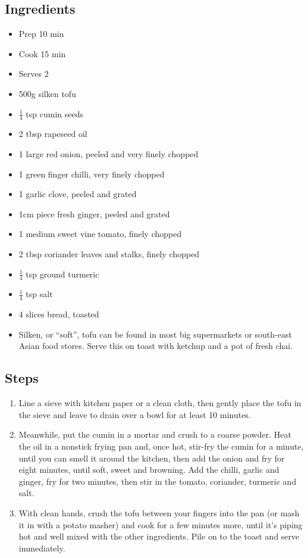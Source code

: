 \documentclass{book}
\begin{document}
\subsection*{Ingredients}
\begin{itemize}
\item Prep 10 min
\item Cook 15 min
\item Serves 2
\end{itemize}

\begin{itemize}
\item 500g silken tofu
\item $\frac{1}{4}$ tsp cumin seeds 
\item 2 tbsp rapeseed oil
\item 1 large red onion, peeled and very finely chopped 
\item 1 green finger chilli, very finely chopped 
\item 1 garlic clove, peeled and grated 
\item 1cm piece fresh ginger, peeled and grated 
\item 1 medium sweet vine tomato, finely chopped 
\item 2 tbsp coriander leaves and stalks, finely chopped 
\item $\frac{1}{4}$ tsp ground turmeric
\item $\frac{1}{4}$ tsp salt
\item 4 slices bread, toasted
\end{itemize}

\begin{itemize}
\item Silken, or “soft”, tofu can be found in most big supermarkets or south-east Asian food stores. Serve this on toast with ketchup and a pot of fresh chai.
\end{itemize}

\subsection*{Steps}
\begin{enumerate}
\item Line a sieve with kitchen paper or a clean cloth, then gently place the tofu in the sieve and leave to drain over a bowl for at least 10 minutes.
\item Meanwhile, put the cumin in a mortar and crush to a coarse powder. Heat the oil in a nonstick frying pan and, once hot, stir-fry the cumin for a minute, until you can smell it around the kitchen, then add the onion and fry for eight minutes, until soft, sweet and browning. Add the chilli, garlic and ginger, fry for two minutes, then stir in the tomato, coriander, turmeric and salt.
\item With clean hands, crush the tofu between your fingers into the pan (or mash it in with a potato masher) and cook for a few minutes more, until it’s piping hot and well mixed with the other ingredients. Pile on to the toast and serve immediately.
\end{enumerate}
\newpage
\end{document}
